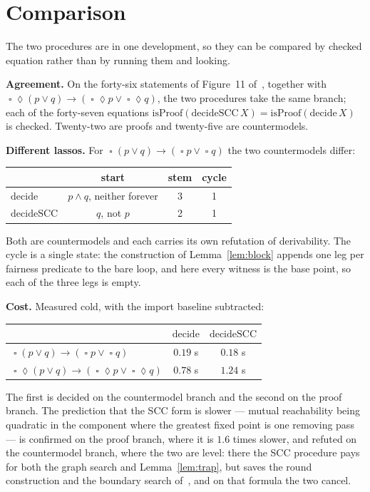 \documentclass[11pt,a4paper]{article}
\theoremstyle{definition}
\newcommand{\Always}{\mathop{\square}}
\newcommand{\Event}{\mathop{\lozenge}}
\begin{document}
\section{Comparison}\label{sec:compare}

The two procedures are in one development, so they can be compared by checked
equation rather than by running them and looking.

\medskip\noindent\textbf{Agreement.}  On the forty-six statements of Figure~11
of~\cite{sgl}, together with
$\Always\Event(p\vee q)\to(\Always\Event p\vee\Always\Event q)$, the two
procedures take the same branch; each of the forty-seven equations
$\mathrm{isProof}(\mathrm{decideSCC}\,X)=\mathrm{isProof}(\mathrm{decide}\,X)$
is checked.  Twenty-two are proofs and twenty-five are countermodels.

\medskip\noindent\textbf{Different lassos.}  For
$\Always(p\vee q)\to(\Always p\vee\Always q)$ the two countermodels differ:
\begin{center}
\begin{tabular}{lccc}
              & start & stem & cycle\\\hline
$\mathrm{decide}$    & $p\wedge q$, neither forever & 3 & 1\\
$\mathrm{decideSCC}$ & $q$, not $p$                 & 2 & 1\\
\end{tabular}
\end{center}
Both are countermodels and each carries its own refutation of derivability.
The cycle is a single state: the construction of Lemma~\ref{lem:block}
appends one leg per fairness predicate to the bare loop, and here every
witness is the base point, so each of the three legs is empty.

\medskip\noindent\textbf{Cost.}  Measured cold, with the import baseline
subtracted:
\begin{center}
\begin{tabular}{lcc}
   & $\mathrm{decide}$ & $\mathrm{decideSCC}$\\\hline
$\Always(p\vee q)\to(\Always p\vee\Always q)$ & $0.19$ s & $0.18$ s\\
$\Always\Event(p\vee q)\to(\Always\Event p\vee\Always\Event q)$
                                              & $0.78$ s & $1.24$ s\\
\end{tabular}
\end{center}
The first is decided on the countermodel branch and the second on the proof
branch.  The prediction that the SCC form is slower --- mutual reachability
being quadratic in the component where the greatest fixed point is one removing
pass --- is confirmed on the proof branch, where it is $1.6$ times slower, and
refuted on the countermodel branch, where the two are level: there the SCC
procedure pays for both the graph search and Lemma~\ref{lem:trap}, but saves
the round construction and the boundary search of~\cite[Prop.~5.3]{m4}, and on
that formula the two cancel.
\end{document}
